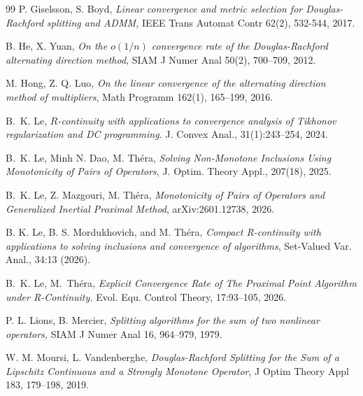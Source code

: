 \documentclass[11pt]{article}
\theoremstyle{definition}
\theoremstyle{definition}
\theoremstyle{definition}
\begin{document}
\begin{thebibliography}{99}
   {\sc P. Giselsson, S. Boyd},  \emph{Linear convergence and metric selection for Douglas-
Rachford splitting and ADMM,} IEEE Trans Automat Contr 62(2), 532-544,
2017.

   {\sc B. He, X. Yuan}, \emph{On the $o(1/n)$ convergence rate of the Douglas-Rachford
alternating direction method}, SIAM J Numer Anal 50(2), 700--709, 2012.

   {\sc M. Hong, Z. Q. Luo},  \emph{On the linear convergence of the alternating direction
method of multipliers}, Math Programm 162(1), 165--199, 2016.

{\sc  B.~K. Le},
 \emph{${R}$-continuity with applications to convergence analysis of
  {T}ikhonov regularization and {DC} programming.}
 { J. Convex Anal.}, 31(1):243--254, 2024.




{\sc B.~K. Le, Minh N. Dao,  M. Théra},
\emph{Solving Non-Monotone Inclusions Using Monotonicity of Pairs of Operators},
 { J. Optim. Theory Appl.}, 207(18), 2025.


	{\sc B.~K. Le, Z. Mazgouri,  M. Théra},
	\emph{Monotonicity of Pairs of Operators and  Generalized Inertial Proximal Method},
	 {arXiv:2601.12738, 2026.} 

{\sc B. K. Le, B. S. Mordukhovich, and M. Th\'era},
\emph{Compact R-continuity with applications to solving inclusions and convergence of algorithms}, {
Set-Valued Var. Anal.},
{ 34}:13 (2026).
	 
{\sc B.~K. Le, M.~Th\'era},
\emph{Explicit {Convergence} {Rate} of {The} {Proximal} {Point} {Algorithm}
  under {R}-{Continuity}.}
 { Evol. Equ. Control Theory}, 17:93--105, 2026.

   {\sc  P. L. Lions, B. Mercier},  \emph{Splitting algorithms for the sum of two nonlinear operators,} SIAM J Numer
Anal 16, 964--979, 1979.

 {\sc  W. M. Moursi,  L. Vandenberghe},   \emph{Douglas-Rachford Splitting for the Sum of a Lipschitz Continuous and a Strongly Monotone Operator}, J Optim Theory Appl 183, 179--198, 2019. 




%


\end{thebibliography}
\end{document}
